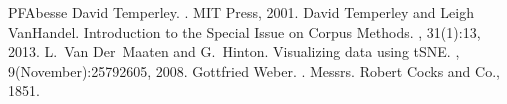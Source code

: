 \documentclass[letterpaper,10pt,english]{sphinxmanual}
\begin{document}
\begin{sphinxthebibliography}{PFAbesse}
David Temperley. . MIT Press, 2001.
David Temperley and Leigh VanHandel. Introduction to the Special Issue on Corpus Methods. , 31(1):1\textendash{}3, 2013.
L. Van Der Maaten and G. Hinton. Visualizing data using t\sphinxhyphen{}SNE. , 9(November):2579\textendash{}2605, 2008.
Gottfried Weber. . Messrs. Robert Cocks and Co., 1851.
\end{sphinxthebibliography}



\renewcommand{\indexname}{Index}
\printindex
\end{document}
